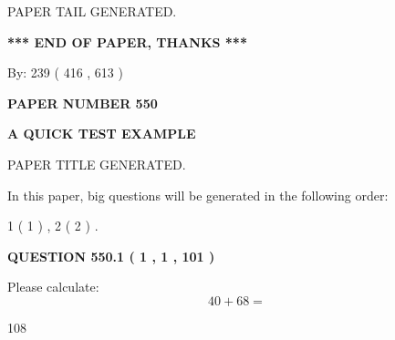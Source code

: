 \documentclass[12pt]{article}
\begin{document}
\vspace{2.0in} PAPER TAIL GENERATED.
   
   
   
   
\vspace{1.0in} 
{\textbf{\large{ *** END OF PAPER, THANKS *** }}} 
   
   
\hspace{1.0in} By: 
 239 ( 416 ,  613 )
   
   
   
   
\newpage 
\setcounter{page}{ 
   550001 } 
   
   
   
   
 {\textbf{ \Large{ PAPER NUMBER  550  }}}
   
   
\vspace{0.2in}
   
   
   
   
   
   
   
   
 \vspace{0.2in}
{\LARGE {\textbf{ A QUICK TEST EXAMPLE}}}
   
   
 PAPER TITLE GENERATED.
   
   
   
\vspace{0.2in}
   
In this paper, big questions will be generated in the following order: 
   
   
   1 ( 1 )
 ,
   2 ( 2 )
 .
  
\vspace{0.2in}
  
{\textbf{\Large{QUESTION
550.1 
 ( 1 , 1 , 101 )
}}}
  
  
 
Please calculate:
\begin{equation}
40 +  %
68 = \nonumber
\end{equation}
 
 
 
\noindent{}
 
 

108
 
 
\noindent{}
 
 

 
 
\end{document}
